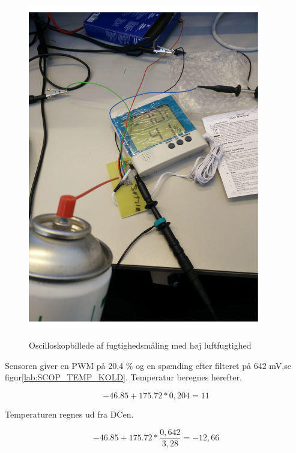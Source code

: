 \begin{figure}[H]
\centering
{\includegraphics[width=0.90\textwidth]{filer/modultest/Billeder/test_KOLD}}
\caption{Oscilloskopbillede af fugtighedsmåling med høj luftfugtighed}
\label{lab:TEST_KOLD}
\end{figure}

Sensoren giver en PWM på 20,4 \% og en spænding efter filteret på 642 mV,se figur\ref{lab:SCOP_TEMP_KOLD}. Temperatur beregnes herefter.


\begin{equation}
-46.85+175.72*0,204=11
\end{equation}

Temperaturen regnes ud fra DCen. 

\begin{equation}
-46.85+175.72*\frac{0,642}{3,28}=-12,66
\end{equation}

